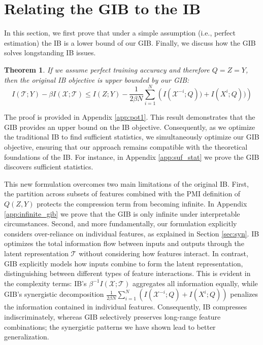 \documentclass{article}
\newtheorem{theorem}{Theorem}
\theoremstyle{definition}
\theoremstyle{remark}
\begin{document}
\section{Relating the GIB to the IB}
In this section, we first prove that under a simple assumption (i.e., perfect estimation) the IB is a lower bound of our GIB. Finally, we discuss how the GIB solves longstanding IB issues.

\begin{theorem}
If we assume perfect training accuracy and therefore $Q = Z = Y$, then the original IB objective is upper bounded by our GIB:
\begin{equation}
I(\mathcal{T}; Y) - \beta I(\mathcal{X}; \mathcal{T}) \leq I(Z;Y) - \frac{1}{2\beta N}\sum_{i=1}^{N} \left(I(\mathcal{X}^{-i}; Q)) + I(X^i; Q))\right)
\end{equation}
\end{theorem}
The proof is provided in Appendix \ref{app:pot1}. This result demonstrates that the GIB provides an upper bound on the IB objective. Consequently, as we optimize the traditional IB to find sufficient statistics, we simultaneously optimize our GIB objective, ensuring that our approach remains compatible with the theoretical foundations of the IB. For instance, in Appendix \ref{app:suf_stat} we prove the GIB discovers sufficient statistics.

This new formulation overcomes two main limitations of the original IB. First, the partition across subsets of features combined with the PMI definition of $Q(Z,Y)$ protects the compression term from becoming infinite. In Appendix \ref{app:infinite_gib} we prove that the GIB is only infinite under interpretable circumstances. Second, and more fundamentally, our formulation explicitly considers over-reliance on individual features, as explained in Section \ref{sec:syn}. IB optimizes the total information flow between inputs and outputs through the latent representation $\mathcal{T}$ without considering how features interact. In contrast, GIB explicitly models how inputs combine to form the latent representation, distinguishing between different types of feature interactions. This is evident in the complexity terms: IB's $\beta^{-1}I(\mathcal{X};\mathcal{T})$ aggregates all information equally, while GIB's synergistic decomposition $\frac{1}{2\beta N} \sum_{i=1}^{N} \left(I(\mathcal{X}^{-i}; Q) + I(X^i; Q)\right)$ penalizes the information contained in individual features. Consequently, IB compresses indiscriminately, whereas GIB selectively preserves long-range feature combinations; the synergistic patterns we have shown lead to better generalization. 
\end{document}
